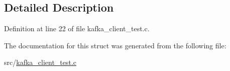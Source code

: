 \subsection{\-Detailed \-Description}


\-Definition at line 22 of file kafka\-\_\-client\-\_\-test.\-c.



\-The documentation for this struct was generated from the following file\-:\begin{DoxyCompactItemize}
\item 
src/\hyperlink{kafka__client__test_8c}{kafka\-\_\-client\-\_\-test.\-c}\end{DoxyCompactItemize}
